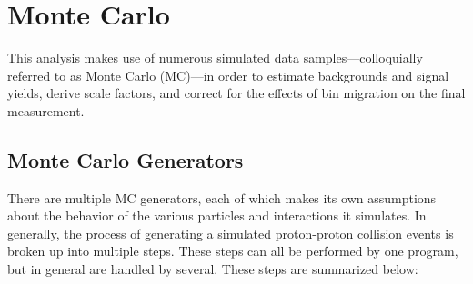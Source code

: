 \section{Monte Carlo}

This analysis makes use of numerous simulated data samples---colloquially
referred to as Monte Carlo (MC)---in order to estimate backgrounds and signal
yields, derive scale factors, and correct for the effects of bin migration on
the final measurement.

\subsection{Monte Carlo Generators}

There are multiple MC generators, each of which makes its own assumptions about
the behavior of the various particles and interactions it simulates. In
generally, the process of generating a simulated proton-proton collision
events is broken up into multiple steps. These steps can all be performed by one
program, but in general are handled by several. These steps are summarized
below:

